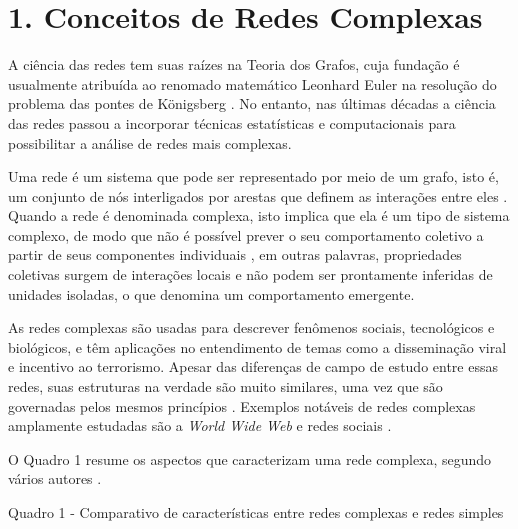 \documentclass[12pt,oneside,a4paper,brazil,sumario=tradicional]{abntex2}
\begin{document}
\section*{1. Conceitos de Redes Complexas}
A ciência das redes tem suas raízes na Teoria dos Grafos, cuja fundação é usualmente atribuída ao renomado matemático Leonhard Euler na resolução do problema das pontes de Königsberg \cite{harary1960}. No entanto, nas últimas décadas a ciência das redes passou a incorporar técnicas estatísticas e computacionais para possibilitar a análise de redes mais complexas.

Uma rede é um sistema que pode ser representado por meio de um grafo, isto é,  um conjunto de nós interligados por arestas que definem as interações entre eles \cite{newman2003, wang2003}. Quando a rede é denominada complexa, isto implica que ela é um tipo de sistema complexo, de modo que não é possível prever o seu comportamento coletivo a partir de seus componentes individuais \cite{mata2020}, em outras palavras, propriedades coletivas surgem de interações locais e não podem ser prontamente inferidas de unidades isoladas, o que denomina um comportamento emergente.

As redes complexas são usadas para descrever fenômenos sociais, tecnológicos e biológicos, e têm aplicações no entendimento de temas como a disseminação viral e incentivo ao terrorismo. Apesar das diferenças de campo de estudo entre essas redes, suas estruturas na verdade são muito similares, uma vez que são governadas pelos mesmos princípios \cite{mata2020}. Exemplos notáveis de redes complexas amplamente estudadas são a \textit{World Wide Web} e redes sociais \cite{newman2003}.

O Quadro 1 resume os aspectos que caracterizam uma rede complexa, segundo vários autores \cite{mata2020, newman2003, wang2003}.

Quadro 1 - Comparativo de características entre redes complexas e redes simples
\end{document}
